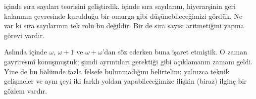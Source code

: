 \documentclass[../../../include/open-logic-section]{subfiles}
\begin{document}


 içinde sıra sayıları teorisini geliştirdik.
 içinde sıra sayılarını, hiyerarşinin geri kalanının
çevresinde kurulduğu bir omurga gibi düşünebileceğimizi gördük. Ne var ki
sıra sayılarının tek rolü bu değildir. Bir de sıra sayısı aritmetiğini
yapma görevi vardır.

Aslında  içinde $\omega$, $\omega+1$ ve
$\omega+\omega$'dan söz ederken buna işaret etmiştik. O zaman gayriresmî
konuşmuştuk; şimdi ayrıntıları gerektiği gibi açıklamanın zamanı geldi. Yine
de bu bölümde fazla felsefe bulunmadığını belirtelim: yalnızca teknik
gelişmeler ve aynı şeyi iki farklı yoldan yapabileceğimize ilişkin (biraz)
ilginç bir gözlem vardır.
\end{document}
